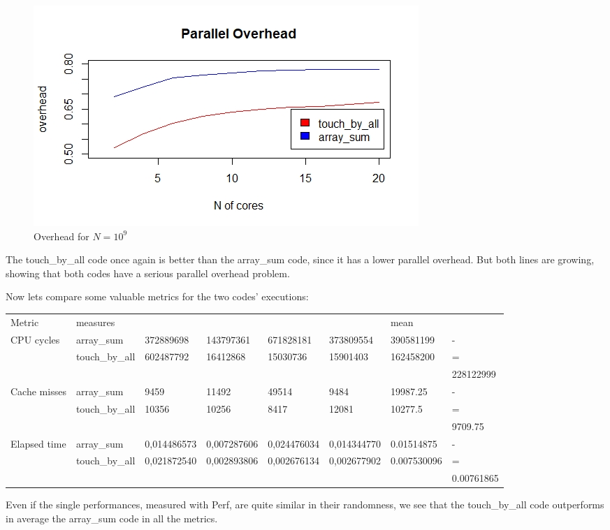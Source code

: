 \documentclass{article}
\begin{document}
\begin{figure}[H] %
	\centering
	\includegraphics[width=0.8\columnwidth]{graphs/exercise_0_overhead} %
	\caption{Overhead for $N=10^9$}
\end{figure}
The touch\_by\_all code once again is better than the array\_sum code, since it has a lower parallel overhead.
But both lines are growing, showing that both codes have a serious parallel overhead problem.

Now lets compare some valuable metrics for the two codes' executions:

\begin{adjustwidth}{-3cm}{}
\begin{tabular}[H]{l|l |l l l l| l l}
Metric & measures&&&&&mean&\\
CPU cycles& array\_sum &372889698& 143797361&671828181&373809554&390581199&-\\
          & touch\_by\_all&602487792&16412868&15030736&15901403&162458200&= \\
&&&&&&&	228122999\\				
					\hline
Cache misses & array\_sum&9459& 11492&49514&9484&19987.25&-\\
          & touch\_by\_all& 10356&10256 & 8417&12081&10277.5&=\\
&&&&&&&	 9709.75\\				
\hline
Elapsed time   & array\_sum& 0,014486573&0,007287606&0,024476034& 0,014344770&0.01514875&- \\
          & touch\_by\_all &0,021872540&0,002893806&0,002676134&0,002677902&0.007530096&=\\
					&&&&&&&	 0.00761865\\				
\hline
\end{tabular}
\end{adjustwidth}
Even if the single performances, measured with Perf, are quite similar in their randomness, we see that the touch\_by\_all code outperforms in average the array\_sum code in all the metrics.
\end{document}
